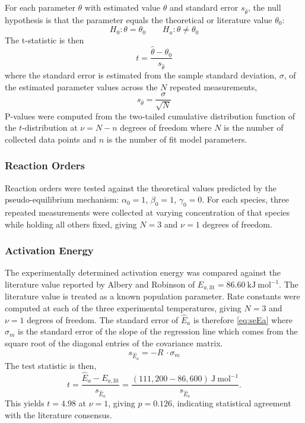 For each parameter $\theta$ with estimated value $\hat{\theta}$ and standard error $s_{\hat{\theta}}$,
the null hypothesis is that the parameter equals the theoretical or literature value $\theta_0$:
\begin{equation}
    H_0: \theta = \theta_0 \qquad H_a: \theta \neq \theta_0
\end{equation}
The t-statistic is then
\begin{equation}
    t = \frac{\hat{\theta} - \theta_0}{s_{\hat{\theta}}}
\end{equation}
where the standard error is estimated from the sample standard deviation, $\sigma$, of the estimated parameter values across the $N$ repeated measurements,
\begin{equation}
    s_{\hat{\theta}} = \frac{\sigma}{\sqrt{N}}
\end{equation}
P-values were computed from the two-tailed cumulative distribution function of the $t$-distribution at $\nu = N - n$ degrees of freedom where $N$ is the number of collected data points and $n$ is the number of fit model parameters.

\subsubsection*{Reaction Orders}

Reaction orders were tested against the theoretical values predicted by the pseudo-equilibrium mechanism: $\alpha_0 = 1$, $\beta_0 = 1$, $\gamma_0 = 0$. For each species, three repeated measurements were collected at varying concentration of that species while holding all others fixed, giving $N = 3$ and $\nu = 1$ degrees of freedom. 

\subsubsection*{Activation Energy}

The experimentally determined activation energy was compared against the literature value reported by Albery and Robinson \cite{albery_measurement_1969} of $E_{a,\mathrm{lit}} = 86.60\ \mathrm{kJ\ mol^{-1}}$. The literature value is treated as a known population parameter. Rate constants were computed at each of the three experimental temperatures, giving $N = 3$ and $\nu = 1$ degrees of freedom. The standard error of $\hat{E}_a$ is therefore \cref{eq:seEa} where $\sigma_m$ is the standard error of the slope of the regression line which comes from the square root of the diagonal entries of the covariance matrix.
\begin{equation}
    s_{\hat{E}_a} = - R \,\cdot \sigma_m \label{eq:seEa}
\end{equation}
The test statistic is then,
\begin{equation}
    t = \frac{\hat{E}_a - E_{a,\mathrm{lit}}}{s_{\hat{E}_a}}
    = \frac{(111{,}200 - 86{,}600)\ \mathrm{J\ mol^{-1}}}{s_{\hat{E}_a}}.
\end{equation}
This yields $t = 4.98$ at $\nu = 1$, giving $p = 0.126$, indicating  statistical agreement with the literature consensus. 

